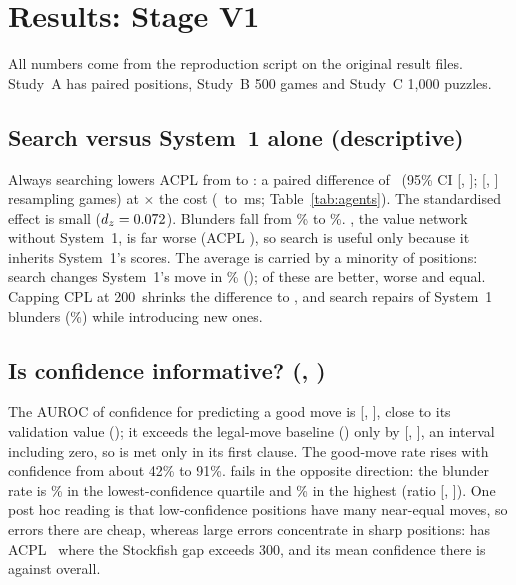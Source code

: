 \section{Results: Stage V1}
\label{sec:results}
All numbers come from the reproduction script on the original result files. Study~A has \nPos{} paired positions, Study~B 500 games and Study~C 1{,}000 puzzles.

\subsection{Search versus System~1 alone (descriptive)}
\label{sec:search-value}
Always searching lowers ACPL from \acplLaya{} to \acplSTwo{}: a paired difference of \dAcpl{}\cp\ (95\% CI [\dAcplLo, \dAcplHi]; [\dClLo, \dClHi] resampling games) at \costRatio$\times$ the cost (\msLaya\ to \msSTwo\,ms; Table~\ref{tab:agents}). The standardised effect is small ($d_z=0.072$). Blunders fall from \blunLaya\% to \blunSTwo\%. , the value network without System~1, is far worse (ACPL \acplMcts{}), so search is useful only because it inherits System~1's scores. The average is carried by a minority of positions: search changes System~1's move in \fracChanged\% (\nChanged{}); of these \nBetter{} are better, \nWorse{} worse and \nEqual{} equal. Capping CPL at 200\cp\ shrinks the difference to \capTwoHundred\cp, and search repairs \nFixed{} of \nLayaBlunder{} System~1 blunders (\fixedPct\%) while introducing \nIntro{} new ones.

\begin{table}[t]
\centering
\caption{Study~A (test split, $n=\nPos$ positions per agent). System~1 = , Always~S2 = , MCTS only = ; time is mean wall time per move.}
\label{tab:agents}
\small

\end{table}

\subsection{Is confidence informative? (\Hone{}, \Hfour{})}
The AUROC of confidence for predicting a good move is \aucConf{} [\aucConfLo, \aucConfHi], close to its validation value (\valAuc{}); it exceeds the legal-move baseline (\aucBase{}) only by \aucDiff{} [\aucDiffLo, \aucDiffHi], an interval including zero, so \Hone{} is met only in its first clause. The good-move rate rises with confidence from about 42\% to 91\%. \Hfour{} fails in the opposite direction: the blunder rate is \qOne\% in the lowest-confidence quartile and \qFour\% in the highest (ratio \qRatio{} [\qRatioLo, \qRatioHi]). One post hoc reading is that low-confidence positions have many near-equal moves, so errors there are cheap, whereas large errors concentrate in sharp positions:  has ACPL \acplSharp\cp\ where the Stockfish gap exceeds 300\cp, and its mean confidence there is \confSharp{} against \meanConfAll{} overall.

